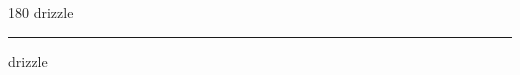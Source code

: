
\begin{frame}
\begin{center}
\begin{turn}{180}
{\fontsize{2.5cm}{1em}\selectfont drizzle}
\end{turn}
\vspace{1em}\par  
\hrule
\vspace{1em}\par  
{\fontsize{2.5cm}{1em}\selectfont drizzle}
\end{center}
\end{frame}
